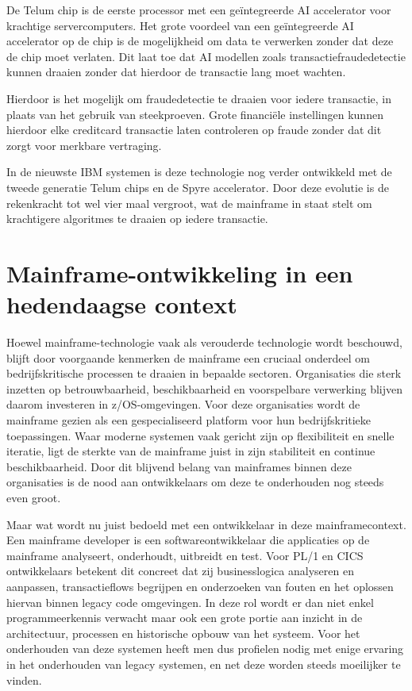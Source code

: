 De Telum chip is de eerste processor met een geïntegreerde AI accelerator voor krachtige servercomputers.
Het grote voordeel van een geïntegreerde AI accelerator op de chip is de mogelijkheid om data te verwerken zonder dat deze de chip moet verlaten.
Dit laat toe dat AI modellen zoals transactiefraudedetectie kunnen draaien zonder dat hierdoor de transactie lang moet wachten.

Hierdoor is het mogelijk om fraudedetectie te draaien voor iedere transactie, in plaats van het gebruik van steekproeven.
Grote financiële instellingen kunnen hierdoor elke creditcard transactie laten controleren op fraude zonder dat dit zorgt voor merkbare vertraging.

In de nieuwste IBM systemen is deze technologie nog verder ontwikkeld met de tweede generatie Telum chips en de Spyre accelerator.
Door deze evolutie is de rekenkracht tot wel vier maal vergroot, wat de mainframe in staat stelt om krachtigere algoritmes te draaien op iedere transactie.



\section{Mainframe-ontwikkeling in een hedendaagse context}%
\label{sec:mainframe_context}

Hoewel mainframe-technologie vaak als verouderde technologie wordt beschouwd, blijft door voorgaande kenmerken de mainframe een cruciaal onderdeel om bedrijfskritische processen te draaien in bepaalde sectoren.
Organisaties die sterk inzetten op betrouwbaarheid, beschikbaarheid en voorspelbare verwerking blijven daarom investeren in z/OS-omgevingen. 
Voor deze organisaties wordt de mainframe gezien als een gespecialiseerd platform voor hun bedrijfskritieke toepassingen.
Waar moderne systemen vaak gericht zijn op flexibiliteit en snelle iteratie, ligt de sterkte van de mainframe juist in zijn stabiliteit en continue beschikbaarheid.
Door dit blijvend belang van mainframes binnen deze organisaties is de nood aan ontwikkelaars om deze te onderhouden nog steeds even groot.

Maar wat wordt nu juist bedoeld met een ontwikkelaar in deze mainframecontext.
Een mainframe developer is een softwareontwikkelaar die applicaties op de mainframe analyseert, onderhoudt, uitbreidt en test.
Voor PL/1 en CICS ontwikkelaars betekent dit concreet dat zij businesslogica analyseren en aanpassen, transactieflows begrijpen en onderzoeken van fouten en het oplossen hiervan binnen legacy code omgevingen.
In deze rol wordt er dan niet enkel programmeerkennis verwacht maar ook een grote portie aan inzicht in de architectuur, processen en historische opbouw van het systeem.
Voor het onderhouden van deze systemen heeft men dus profielen nodig met enige ervaring in het onderhouden van legacy systemen, en net deze worden steeds moeilijker te vinden.


